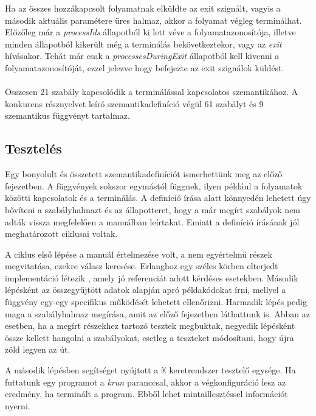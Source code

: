 

Ha az összes hozzákapcsolt folyamatnak elküldte az exit szignált, vagyis a második aktuális paramétere üres halmaz, akkor a folyamat végleg terminálhat. Előzőleg már a \textit{processIds} állapotból ki lett véve a folyamatazonosítója, illetve minden állapotból kikerült még a terminálás bekövetkeztekor, vagy az \textit{exit} hívásakor. Tehát már csak a \textit{processesDuringExit} állapotból kell kivenni a folyamatazonosítóját, ezzel jelezve hogy befejezte az exit szignálok küldést.

\paragraph{}
Összesen 21 szabály kapcsolódik a terminálással kapcsolatos szemantikához. A konkurens résznyelvet leíró szemantikadefiníció végül 61 szabályt és 9 szemantikus függvényt tartalmaz.

\subsection{Tesztelés}

Egy bonyolult és összetett szemantikadefiníciót ismerhettünk meg az előző fejezetben. A függvények sokszor egymástól függnek, ilyen például a folyamatok közötti kapcsolatok és a terminálás. A definíció írása alatt könnyedén lehetett úgy bővíteni a szabályhalmazt és az állapotteret, hogy a már megírt szabályok nem adták vissza megfelelően a manuálban leírtakat. Emiatt a definíció írásának jól meghatározott ciklusai voltak.

A ciklus első lépése a manuál értelmezése volt, a nem egyértelmű részek megvitatása, ezekre válasz keresése. Erlanghoz egy széles körben elterjedt implementáció létezik \cite{ErlRefDown}, amely jó referenciát adott kérdéses esetekben. Második lépésként az összegyűjtött adatok alapján apró példakódokat írni, mellyel a függvény egy-egy specifikus működését lehetett ellenőrizni. Harmadik lépés pedig maga a szabályhalmaz megírása, amit az előző fejezetben láthattunk is. Abban az esetben, ha a megírt részekhez tartozó tesztek megbuktak, negyedik lépésként össze kellett hangolni a szabályokat, esetleg a teszteket módosítani, hogy újra zöld legyen az út.

A második lépésben segítséget nyújtott a $\mathbb{K}$ keretrendszer tesztelő egysége. Ha futtatunk egy programot a \textit{krun} paranccsal, akkor a végkonfiguráció lesz az eredmény, ha terminált a program. Ebből lehet mintaillesztéssel információt nyerni.


